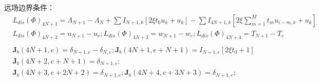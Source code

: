 远场边界条件：
\begin{equation*}
  \begin{aligned}\label{}
    & L_{dis} \left( \Phi  \right)_{4N + 1}  = \Lambda_{N + 1}  - \Lambda_N  + \sum {I_{N + 1,k} \left[ {2\xi t_0 u_k  + u_k } \right]}  - \sum {I_{4N + 1,k} \left[ {2\xi \sum\limits_{m = 1}^M {t_m u_{i - m,k} }  + u_k } \right]}\\
    & L_{dis} \left( \Phi  \right)_{4N + 2}  = u_{N + 1} -u_e;L_{dis} \left( \Phi  \right)_{4N + 3}  = w_{N + 1} -w_e;L_{dis} \left( \Phi  \right)_{4N + 4}  = T_{N + 1} -T_e\\
  \end{aligned}
\end{equation*}
\begin{equation*}
  \begin{array}{l}
     \mathbf{J}_b(4N + 1,e) = \delta _{N + 1,e}  - \delta _{N,e} ;\mathbf{J}_b(4N + 1,e + N + 1) = I_{N + 1,e} \left[ {2\xi t_0  + 1} \right] \\
     \mathbf{J}_b(4N + 2,e + N + 1) = \delta _{N + 1,e} ; \\
     \mathbf{J}_b(4N + 3,e + 2N + 2) = \delta _{N + 1,e} ;\mathbf{J}_b(4N + 4,e + 3N + 3) = \delta _{N + 1,e} ; \\
  \end{array}
\end{equation*} 
